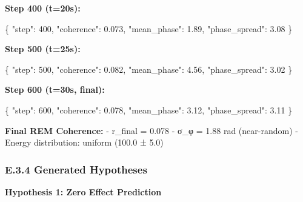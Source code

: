 \documentclass[
]{article}
\newenvironment{Shaded}{}{}
\newcommand{\DataTypeTok}[1]{\textcolor[rgb]{0.56,0.13,0.00}{#1}}
\newcommand{\DecValTok}[1]{\textcolor[rgb]{0.25,0.63,0.44}{#1}}
\newcommand{\FloatTok}[1]{\textcolor[rgb]{0.25,0.63,0.44}{#1}}
\newcommand{\FunctionTok}[1]{\textcolor[rgb]{0.02,0.16,0.49}{#1}}
\begin{document}
\textbf{Step 400 (t=20s):}

\begin{Shaded}
\begin{Highlighting}[]
\FunctionTok{\{}
  \DataTypeTok{"step"}\FunctionTok{:} \DecValTok{400}\FunctionTok{,}
  \DataTypeTok{"coherence"}\FunctionTok{:} \FloatTok{0.073}\FunctionTok{,}
  \DataTypeTok{"mean\_phase"}\FunctionTok{:} \FloatTok{1.89}\FunctionTok{,}
  \DataTypeTok{"phase\_spread"}\FunctionTok{:} \FloatTok{3.08}
\FunctionTok{\}}
\end{Highlighting}
\end{Shaded}

\textbf{Step 500 (t=25s):}

\begin{Shaded}
\begin{Highlighting}[]
\FunctionTok{\{}
  \DataTypeTok{"step"}\FunctionTok{:} \DecValTok{500}\FunctionTok{,}
  \DataTypeTok{"coherence"}\FunctionTok{:} \FloatTok{0.082}\FunctionTok{,}
  \DataTypeTok{"mean\_phase"}\FunctionTok{:} \FloatTok{4.56}\FunctionTok{,}
  \DataTypeTok{"phase\_spread"}\FunctionTok{:} \FloatTok{3.02}
\FunctionTok{\}}
\end{Highlighting}
\end{Shaded}

\textbf{Step 600 (t=30s, final):}

\begin{Shaded}
\begin{Highlighting}[]
\FunctionTok{\{}
  \DataTypeTok{"step"}\FunctionTok{:} \DecValTok{600}\FunctionTok{,}
  \DataTypeTok{"coherence"}\FunctionTok{:} \FloatTok{0.078}\FunctionTok{,}
  \DataTypeTok{"mean\_phase"}\FunctionTok{:} \FloatTok{3.12}\FunctionTok{,}
  \DataTypeTok{"phase\_spread"}\FunctionTok{:} \FloatTok{3.11}
\FunctionTok{\}}
\end{Highlighting}
\end{Shaded}

\textbf{Final REM Coherence:} - r\_final = 0.078 - σ\_φ = 1.88 rad
(near-random) - Energy distribution: uniform (100.0 ± 5.0)

\subsubsection{E.3.4 Generated
Hypotheses}\label{e.3.4-generated-hypotheses}

\textbf{Hypothesis 1: Zero Effect Prediction}
\end{document}
